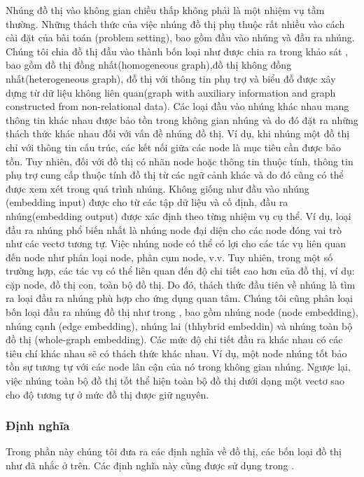 Nhúng đồ thị vào không gian chiều thấp không phải là một nhiệm vụ tầm thường. Những thách thức của việc nhúng đồ thị phụ thuộc rất nhiều vào cách cài đặt của bài toán (problem setting), bao gồm đầu vào nhúng và đầu ra nhúng. Chúng tôi chia đồ thị đầu vào thành bốn loại như được chia ra trong khảo sát \cite{cai2018comprehensive}, bao gồm đồ thị đồng nhất(homogeneous graph),đồ thị không đồng nhất(heterogeneous graph), đồ thị với thông tin phụ trợ và biểu đồ được xây dựng từ dữ liệu không liên quan(graph with auxiliary information and graph constructed from non-relational data). Các loại đầu vào nhúng khác nhau mang thông tin khác nhau được bảo tồn trong không gian nhúng và do đó đặt ra những thách thức khác nhau đối với vấn đề nhúng đồ thị. Ví dụ, khi nhúng một đồ thị chỉ với thông tin cấu trúc, các kết nối giữa các node là mục tiêu cần được bảo tồn. Tuy nhiên, đối với đồ thị có nhãn node hoặc thông tin thuộc tính, thông tin phụ trợ cung cấp thuộc tính đồ thị từ các ngữ cảnh khác và do đó cũng có thể được xem xét trong quá trình nhúng. Không giống như đầu vào nhúng (embedding input) được cho từ các tập dữ liệu và cố định, đầu ra nhúng(embedding output) được xác định theo từng nhiệm vụ cụ thể. Ví dụ, loại đầu ra nhúng phổ biến nhất là nhúng node đại diện cho các node đóng vai trò như các vectơ tương tự. Việc nhúng node có thể có lợi cho các tác vụ liên quan đến node như phân loại node, phân cụm node, v.v. Tuy nhiên, trong một số trường hợp, các tác vụ có thể liên quan đến độ chi tiết cao hơn của đồ thị, ví dụ: cặp node, đồ thị con, toàn bộ đồ thị. Do đó, thách thức đầu tiên về nhúng là tìm ra loại đầu ra nhúng phù hợp cho ứng dụng quan tâm. Chúng tôi cũng phân loại bốn loại đầu ra nhúng đồ thị như trong \cite{cai2018comprehensive}, bao gồm nhúng node (node embedding), nhúng cạnh (edge embedding), nhúng lai (thhybrid embeddin) và nhúng toàn bộ đồ thị (whole-graph embedding). Các mức độ chi tiết đầu ra khác nhau có các tiêu chí khác nhau sẽ có thách thức khác nhau. Ví dụ, một node nhúng tốt bảo tồn sự tương tự với các node lân cận của nó trong không gian nhúng. Ngược lại, việc nhúng toàn bộ đồ thị tốt thể hiện toàn bộ đồ thị dưới dạng một vectơ sao cho độ tương tự ở mức đồ thị được giữ nguyên.

\subsubsection{Định nghĩa}
Trong phần này chúng tôi đưa ra các định nghĩa về đồ thị, các bốn loại đồ thị như đã nhắc ở trên. Các định nghĩa này cũng được sử dụng trong \cite{cai2018comprehensive}.

